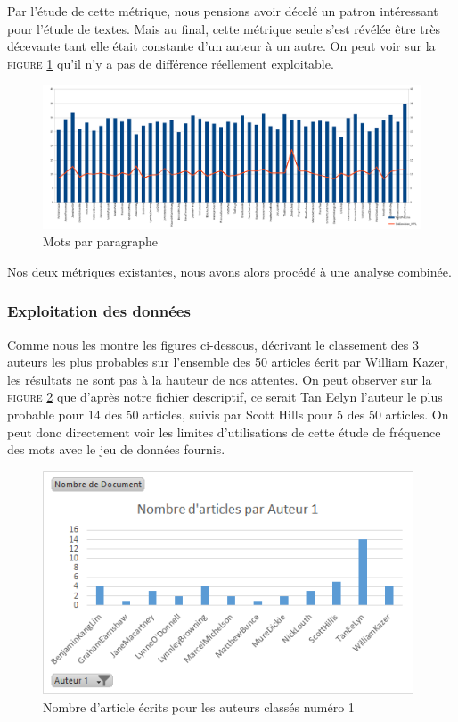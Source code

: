\documentclass[a4paper,12pt]{report}
\begin{document}
Par l'étude de cette métrique, nous pensions avoir décelé un patron intéressant pour l'étude de textes. Mais au final, cette métrique seule s'est révélée être très décevante tant elle était constante d'un auteur à un autre. On peut voir sur la \textsc{figure \ref{WPL}} qu'il n'y a pas de différence réellement exploitable.
				
\begin{figure}[hbtp]
\centering
\includegraphics[width=15cm]{fig/WPL.png}
\caption{Mots par paragraphe}
\label{WPL}
\end{figure}

Nos deux métriques existantes, nous avons alors procédé à une analyse combinée.

\subsubsection{Exploitation des données}

Comme nous les montre les figures ci-dessous, décrivant le classement des 3 auteurs les plus probables sur l'ensemble des 50 articles écrit par William Kazer, les résultats ne sont pas à la hauteur de nos attentes. On peut observer sur la \textsc{figure \ref{auteur1}} que d'après notre fichier descriptif, ce serait Tan Eelyn l'auteur le plus probable pour 14 des 50 articles, suivis par Scott Hills pour 5 des 50 articles. On peut donc directement voir les limites d'utilisations de cette étude de fréquence des mots avec le jeu de données fournis. 

\begin{figure}[H]
\centering
\includegraphics[width=11cm]{fig/Auteur1.png}
\caption{Nombre d'article écrits pour les auteurs classés numéro 1}
\label{auteur1}
\end{figure}
\end{document}
